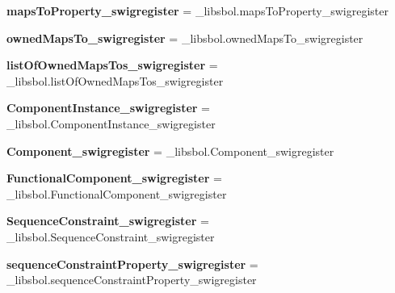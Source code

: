 \begin{DoxyCompactItemize}
\item 
{\bfseries maps\+To\+Property\+\_\+swigregister} = \+\_\+libsbol.\+maps\+To\+Property\+\_\+swigregister\hypertarget{namespacesbol_1_1libsbol_a9cf9f31b1cc4119a244edeaef37f59f5}{}\label{namespacesbol_1_1libsbol_a9cf9f31b1cc4119a244edeaef37f59f5}

\item 
{\bfseries owned\+Maps\+To\+\_\+swigregister} = \+\_\+libsbol.\+owned\+Maps\+To\+\_\+swigregister\hypertarget{namespacesbol_1_1libsbol_acfc12b5523c3089a483c7f8a667cf38b}{}\label{namespacesbol_1_1libsbol_acfc12b5523c3089a483c7f8a667cf38b}

\item 
{\bfseries list\+Of\+Owned\+Maps\+Tos\+\_\+swigregister} = \+\_\+libsbol.\+list\+Of\+Owned\+Maps\+Tos\+\_\+swigregister\hypertarget{namespacesbol_1_1libsbol_a5d54f74313f8fc6c7d774ccf6c5cc3d5}{}\label{namespacesbol_1_1libsbol_a5d54f74313f8fc6c7d774ccf6c5cc3d5}

\item 
{\bfseries Component\+Instance\+\_\+swigregister} = \+\_\+libsbol.\+Component\+Instance\+\_\+swigregister\hypertarget{namespacesbol_1_1libsbol_a296bc042caf0cdc0d7a6d51dc0de6cce}{}\label{namespacesbol_1_1libsbol_a296bc042caf0cdc0d7a6d51dc0de6cce}

\item 
{\bfseries Component\+\_\+swigregister} = \+\_\+libsbol.\+Component\+\_\+swigregister\hypertarget{namespacesbol_1_1libsbol_af292bff8a493d524eb263755656fc4a0}{}\label{namespacesbol_1_1libsbol_af292bff8a493d524eb263755656fc4a0}

\item 
{\bfseries Functional\+Component\+\_\+swigregister} = \+\_\+libsbol.\+Functional\+Component\+\_\+swigregister\hypertarget{namespacesbol_1_1libsbol_a83d00a84017bf8647ce74cd1a7c75601}{}\label{namespacesbol_1_1libsbol_a83d00a84017bf8647ce74cd1a7c75601}

\item 
{\bfseries Sequence\+Constraint\+\_\+swigregister} = \+\_\+libsbol.\+Sequence\+Constraint\+\_\+swigregister\hypertarget{namespacesbol_1_1libsbol_adac9550cbd984c8c9bc1b5384e15f569}{}\label{namespacesbol_1_1libsbol_adac9550cbd984c8c9bc1b5384e15f569}

\item 
{\bfseries sequence\+Constraint\+Property\+\_\+swigregister} = \+\_\+libsbol.\+sequence\+Constraint\+Property\+\_\+swigregister\hypertarget{namespacesbol_1_1libsbol_a45aa8318f1b3ace7feb9447754112e0e}{}\label{namespacesbol_1_1libsbol_a45aa8318f1b3ace7feb9447754112e0e}


\end{DoxyCompactItemize}
